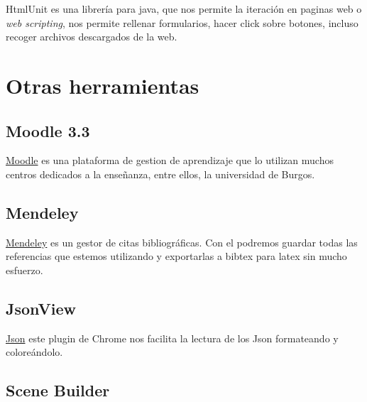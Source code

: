 HtmlUnit es una librería para java, que nos permite la iteración en paginas web o \emph{web scripting}, nos permite rellenar formularios, hacer click sobre botones, incluso recoger archivos descargados de la web. \cite{Java:htmlunit}




\section{Otras herramientas}\label{otras-herramientas}

\subsection{Moodle 3.3}\label{moodle}

\href{https://moodle.org/?lang=es}{Moodle} es una plataforma de gestion de aprendizaje que lo utilizan muchos centros dedicados a la enseñanza, entre ellos, la universidad de Burgos. 

\subsection{Mendeley}\label{mendeley}

\href{https://www.mendeley.com/}{Mendeley} es un gestor de citas bibliográficas. Con el podremos guardar todas las referencias que estemos utilizando y exportarlas a bibtex para latex sin mucho esfuerzo.

\subsection{JsonView}\label{jsonview}

\href{https://chrome.google.com/webstore/detail/jsonview/chklaanhfefbnpoihckbnefhakgolnmc}{Json} este plugin de Chrome nos facilita la lectura de los Json formateando y coloreándolo.

\subsection{Scene Builder}\label{scene-builder}

